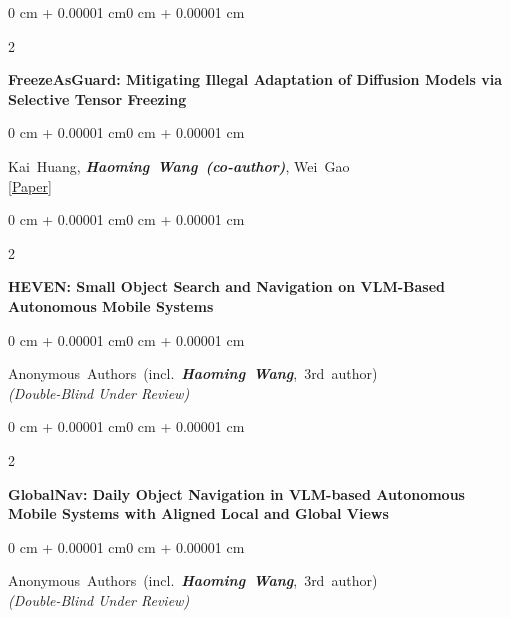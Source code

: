 \documentclass[10pt, letterpaper]{article}
\newenvironment{onecolentry}{
    \begin{adjustwidth}{0 cm + 0.00001 cm}{0 cm + 0.00001 cm}
}{
    \end{adjustwidth}
}
\newenvironment{twocolentry}[2][]{
    \onecolentry
    \def\secondColumn{#2}
    \setcolumnwidth{\fill, 4.5 cm}
    \begin{paracol}{2}
}{
    \switchcolumn \raggedleft \secondColumn
    \end{paracol}
    \endonecolentry
}
\let\hrefWithoutArrow\href
\begin{document}
\begin{samepage}
            \vspace{0.3 cm}

            \begin{twocolentry}{
                2024
            }
                \textbf{FreezeAsGuard: Mitigating Illegal Adaptation of Diffusion Models via Selective Tensor Freezing}
            \end{twocolentry}
            \vspace{0.10 cm}
            \begin{onecolentry}
                \mbox{Kai Huang}, \mbox{\textbf{\textit{Haoming Wang (co-author)}}}, \mbox{Wei Gao}
                \vspace{0.10 cm}
                \\ \hrefWithoutArrow{https://haomingwang645.github.io/pdfs/freezeasguard_paper.pdf}{[Paper]}
            \end{onecolentry}

            \vspace{0.3 cm}

            \begin{twocolentry}{
                2026
            }
                \textbf{HEVEN: Small Object Search and Navigation on VLM-Based Autonomous Mobile Systems}
            \end{twocolentry}
            \vspace{0.10 cm}
            \begin{onecolentry}
                \mbox{Anonymous Authors (incl.\ \textbf{\textit{Haoming Wang}}, 3rd author)}
                \vspace{0.10 cm}
                \\ \textit{(Double-Blind Under Review)}
            \end{onecolentry}

            \vspace{0.3 cm}

            \begin{twocolentry}{
                2026
            }
                \textbf{GlobalNav: Daily Object Navigation in VLM-based Autonomous Mobile Systems with Aligned Local and Global Views}
            \end{twocolentry}
            \vspace{0.10 cm}
            \begin{onecolentry}
                \mbox{Anonymous Authors (incl.\ \textbf{\textit{Haoming Wang}}, 3rd author)}
                \vspace{0.10 cm}
                \\ \textit{(Double-Blind Under Review)}
            \end{onecolentry}


\end{samepage}
\end{document}
